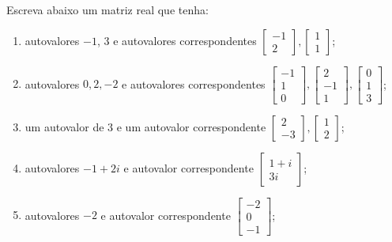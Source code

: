 \begin{question}
  Escreva abaixo um matriz real que tenha:
  \begin{enumerate}[label=\alph*)]
    \item autovalores $-1$, $3$ e autovalores correspondentes $\begin{bmatrix}-1 \\ 2\end{bmatrix}, \begin{bmatrix} 1 \\ 1\end{bmatrix}$;
    \item autovalores $0,2, -2$ e autovalores correspondentes $\begin{bmatrix}-1 \\ 1 \\ 0\end{bmatrix}, \begin{bmatrix} 2 \\ -1 \\ 1\end{bmatrix}, \begin{bmatrix} 0 \\ 1 \\ 3\end{bmatrix}$;
    \item um autovalor de  $3$ e um autovalor correspondente $\begin{bmatrix}2\\ -3 \end{bmatrix}, \begin{bmatrix} 1\\ 2\end{bmatrix}$;
    \item autovalores $-1 + 2i$ e autovalor correspondente $\begin{bmatrix}1+ i \\ 3i\end{bmatrix}$;
    \item autovalores $-2$ e autovalor correspondente $\begin{bmatrix}-2 \\ 0 \\ -1\end{bmatrix}$;
  \end{enumerate}
  \vspace{8pt}
\end{question}

